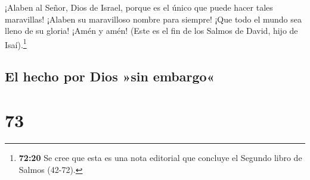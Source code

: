  ¡Alaben al Señor, Dios de Israel, porque es el único que
puede hacer tales maravillas!  ¡Alaben su maravilloso
nombre para siempre! ¡Que todo el mundo sea lleno de su gloria! ¡Amén y
amén!  (Este es el fin de los Salmos de David, hijo de
Isaí).\footnote{\textbf{72:20} Se cree que esta es una nota editorial
  que concluye el Segundo libro de Salmos (42-72).}

\hypertarget{el-hecho-por-dios-sin-embargo}{%
\subsection{El hecho por Dios »sin
embargo«}\label{el-hecho-por-dios-sin-embargo}}

\hypertarget{section-72}{%
\section{73}\label{section-72}}

